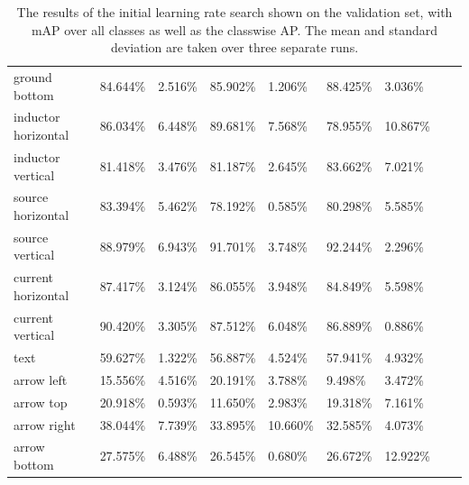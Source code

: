 \begin{table}[H]
\begin{center}
\begin{tabular}{|l|l|l|l|l|l|l|l|l|}
ground bottom                   & 84.644\% & 2.516\%  & 85.902\% & 1.206\%  &  88.425\% & 3.036\%  & & \\
\rowcolor{lightgray!50}
inductor horizontal             & 86.034\% & 6.448\%  & 89.681\% & 7.568\%  &  78.955\% & 10.867\% & & \\
inductor vertical               & 81.418\% & 3.476\%  & 81.187\% & 2.645\%  &  83.662\% & 7.021\%  & & \\
\rowcolor{lightgray!50}
source horizontal               & 83.394\% & 5.462\%  & 78.192\% & 0.585\%  &  80.298\% & 5.585\%  & & \\
source vertical                 & 88.979\% & 6.943\%  & 91.701\% & 3.748\%  &  92.244\% & 2.296\%  & & \\
\rowcolor{lightgray!50}
current horizontal              & 87.417\% & 3.124\%  & 86.055\% & 3.948\%  &  84.849\% & 5.598\%  & & \\
current vertical                & 90.420\% & 3.305\%  & 87.512\% & 6.048\%  &  86.889\% & 0.886\%  & & \\
\rowcolor{lightgray!50}
text                            & 59.627\% & 1.322\%  & 56.887\% & 4.524\%  &  57.941\% & 4.932\%  & & \\
arrow left                      & 15.556\% & 4.516\%  & 20.191\% & 3.788\%  &  9.498\%  & 3.472\%  & & \\
\rowcolor{lightgray!50}
arrow top                       & 20.918\% & 0.593\%  & 11.650\% & 2.983\%  &  19.318\% & 7.161\%  & & \\
arrow right                     & 38.044\% & 7.739\%  & 33.895\% & 10.660\% &  32.585\% & 4.073\%  & & \\
\rowcolor{lightgray!50}
arrow bottom                    & 27.575\% & 6.488\%  & 26.545\% & 0.680\%  &  26.672\% & 12.922\% & & \\
\hline

\end{tabular}
\caption{The results of the initial learning rate search shown on the validation set, with mAP over all classes as well as the classwise AP. The mean and standard deviation are taken over three separate runs.}
\label{tab:yolo_init_lr_results}
\end{center}
\end{table}

